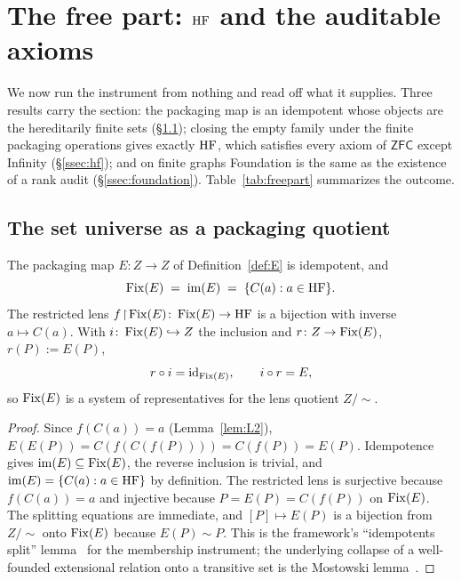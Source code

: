 \section{The free part: \texorpdfstring{$\mathrm{HF}$}{HF} and the auditable axioms}\label{sec:free}

We now run the instrument from nothing and read off what it supplies. Three results carry the
section: the packaging map is an idempotent whose objects are the hereditarily finite sets
(\S\ref{ssec:p5}); closing the empty family under the finite packaging operations gives exactly
$\mathrm{HF}$, which satisfies every axiom of $\mathsf{ZFC}$ except Infinity (\S\ref{ssec:hf}); and on
finite graphs Foundation is the same as the existence of a rank audit (\S\ref{ssec:foundation}).
Table~\ref{tab:freepart} summarizes the outcome.

\subsection{The set universe as a packaging quotient}\label{ssec:p5}

\begin{theorem}\label{thm:p5}
The packaging map $E\colon Z\to Z$ of Definition~\ref{def:E} is idempotent, and
\[
  \operatorname{Fix}(E)\;=\;\operatorname{im}(E)\;=\;\{C(a): a\in\mathrm{HF}\}.
\]
The restricted lens $f\!\upharpoonright\!\operatorname{Fix}(E)\colon \operatorname{Fix}(E)\to\mathrm{HF}$ is a bijection with inverse $a\mapsto
C(a)$. With $i\colon\operatorname{Fix}(E)\hookrightarrow Z$ the inclusion and $r\colon Z\to\operatorname{Fix}(E)$,
$r(P):=E(P)$,
\[
  r\circ i=\mathrm{id}_{\operatorname{Fix}(E)},\qquad i\circ r=E,
\]
so $\operatorname{Fix}(E)$ is a system of representatives for the lens quotient $Z/{\sim}$.
\end{theorem}

\begin{proof}
Since $f(C(a))=a$ (Lemma~\ref{lem:L2}), $E(E(P))=C(f(C(f(P))))=C(f(P))=E(P)$. Idempotence gives
$\operatorname{im}(E)\subseteq\operatorname{Fix}(E)$, the reverse inclusion is trivial, and $\operatorname{im}(E)=\{C(a):a\in\mathrm{HF}\}$ by
definition. The restricted lens is surjective because $f(C(a))=a$ and injective because $P=E(P)=
C(f(P))$ on $\operatorname{Fix}(E)$. The splitting equations are immediate, and $[P]\mapsto E(P)$ is a
bijection from $Z/{\sim}$ onto $\operatorname{Fix}(E)$ because $E(P)\sim P$. This is the framework's
``idempotents split'' lemma~\citep{SBTFoundationsI} for the membership instrument; the
underlying collapse of a well-founded extensional relation onto a transitive set is the Mostowski
lemma~\citep{Mostowski1949}.
\end{proof}

